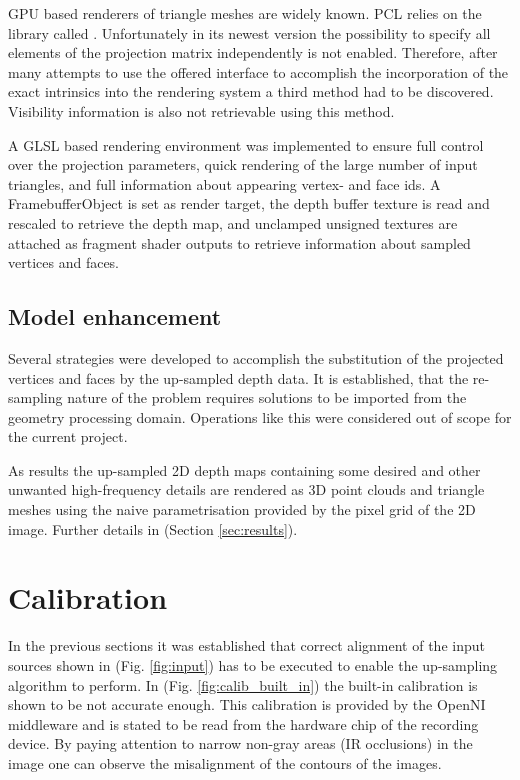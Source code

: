 \documentclass{ucl_thesis}
\newcommand{\figref}[1]{(Fig. \ref{#1})}
\newcommand{\secref}[1]{(Section \ref{#1})}
\begin{document}
\par GPU based renderers of triangle meshes are widely known. PCL relies on the library called \citep{vtk}. Unfortunately in its newest version the possibility to specify all elements of the projection matrix independently is not enabled. Therefore, after many attempts to use the offered interface to accomplish the incorporation of the exact intrinsics into the rendering system a third method had to be discovered. Visibility information is also not retrievable using this method.
\par A GLSL based rendering environment was implemented to ensure full control over the projection parameters, quick rendering of the large number of input triangles, and full information about appearing vertex- and face ids. A FramebufferObject is set as render target, the depth buffer texture is read and rescaled to retrieve the depth map, and unclamped unsigned textures are attached as fragment shader outputs to retrieve information about sampled vertices and faces.

\subsection{Model enhancement}
\par Several strategies were developed to accomplish the substitution of the projected vertices and faces by the up-sampled depth data. It is established, that the re-sampling nature of the problem requires solutions to be imported from the geometry processing domain. Operations like this were considered out of scope for the current project.

\par As results the up-sampled 2D depth maps containing some desired and other unwanted high-frequency details are rendered as 3D point clouds and triangle meshes using the naive parametrisation provided by the pixel grid of the 2D image. Further details in \secref{sec:results}.

\section{Calibration}
\label{sec:calibration}

\par In the previous sections it was established that correct alignment of the input sources shown in \figref{fig:input} has to be executed to enable the up-sampling algorithm to perform. In \figref{fig:calib_built_in} the built-in calibration is shown to be not accurate enough. This calibration is provided by the OpenNI middleware and is stated to be read from the hardware chip of the recording device. By paying attention to narrow non-gray areas (IR occlusions) in the image one can observe the misalignment of the contours of the images.
\end{document}

